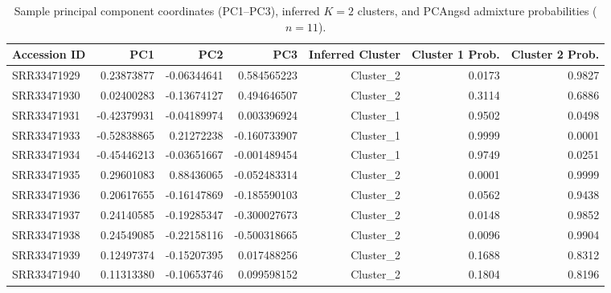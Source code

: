 \documentclass[12pt, a4paper]{article}
\begin{document}
\begin{table}[htbp]
    \centering
    \caption{Sample principal component coordinates (PC1--PC3), inferred $K = 2$ clusters, and PCAngsd admixture probabilities ($n = 11$).}
    \label{tab:sample_coords_admix}
    \footnotesize
    \begin{tabular}{lrrrrrr}
        \toprule
        Accession ID & PC1 & PC2 & PC3 & Inferred Cluster & Cluster 1 Prob. & Cluster 2 Prob. \\
        \midrule
        SRR33471929 &  0.23873877 & -0.06344641 &  0.584565223 & Cluster\_2 & 0.0173 & 0.9827 \\
        SRR33471930 &  0.02400283 & -0.13674127 &  0.494646507 & Cluster\_2 & 0.3114 & 0.6886 \\
        SRR33471931 & -0.42379931 & -0.04189974 &  0.003396924 & Cluster\_1 & 0.9502 & 0.0498 \\
        SRR33471933 & -0.52838865 &  0.21272238 & -0.160733907 & Cluster\_1 & 0.9999 & 0.0001 \\
        SRR33471934 & -0.45446213 & -0.03651667 & -0.001489454 & Cluster\_1 & 0.9749 & 0.0251 \\
        SRR33471935 &  0.29601083 &  0.88436065 & -0.052483314 & Cluster\_2 & 0.0001 & 0.9999 \\
        SRR33471936 &  0.20617655 & -0.16147869 & -0.185590103 & Cluster\_2 & 0.0562 & 0.9438 \\
        SRR33471937 &  0.24140585 & -0.19285347 & -0.300027673 & Cluster\_2 & 0.0148 & 0.9852 \\
        SRR33471938 &  0.24549085 & -0.22158116 & -0.500318665 & Cluster\_2 & 0.0096 & 0.9904 \\
        SRR33471939 &  0.12497374 & -0.15207395 &  0.017488256 & Cluster\_2 & 0.1688 & 0.8312 \\
        SRR33471940 &  0.11313380 & -0.10653746 &  0.099598152 & Cluster\_2 & 0.1804 & 0.8196 \\
        \bottomrule
    \end{tabular}
\end{table}

\end{document}
